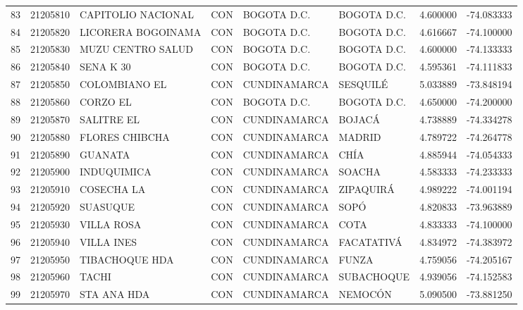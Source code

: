 \documentclass[11pt]{article}
\begin{document}
\begin{table}
\begin{tabular}{lrllllrr}
83  &  21205810 &        CAPITOLIO NACIONAL &  CON &   BOGOTA D.C. &       BOGOTA D.C. &  4.600000 & -74.083333 \\
84  &  21205820 &        LICORERA BOGOINAMA &  CON &   BOGOTA D.C. &       BOGOTA D.C. &  4.616667 & -74.100000 \\
85  &  21205830 &         MUZU CENTRO SALUD &  CON &   BOGOTA D.C. &       BOGOTA D.C. &  4.600000 & -74.133333 \\
86  &  21205840 &                SENA K 30  &  CON &   BOGOTA D.C. &       BOGOTA D.C. &  4.595361 & -74.111833 \\
87  &  21205850 &            COLOMBIANO EL  &  CON &  CUNDINAMARCA &          SESQUILÉ &  5.033889 & -73.848194 \\
88  &  21205860 &                 CORZO EL  &  CON &   BOGOTA D.C. &       BOGOTA D.C. &  4.650000 & -74.200000 \\
89  &  21205870 &               SALITRE EL  &  CON &  CUNDINAMARCA &            BOJACÁ &  4.738889 & -74.334278 \\
90  &  21205880 &            FLORES CHIBCHA &  CON &  CUNDINAMARCA &            MADRID &  4.789722 & -74.264778 \\
91  &  21205890 &                  GUANATA  &  CON &  CUNDINAMARCA &              CHÍA &  4.885944 & -74.054333 \\
92  &  21205900 &              INDUQUIMICA  &  CON &  CUNDINAMARCA &            SOACHA &  4.583333 & -74.233333 \\
93  &  21205910 &               COSECHA LA  &  CON &  CUNDINAMARCA &         ZIPAQUIRÁ &  4.989222 & -74.001194 \\
94  &  21205920 &              SUASUQUE     &  CON &  CUNDINAMARCA &              SOPÓ &  4.820833 & -73.963889 \\
95  &  21205930 &               VILLA ROSA  &  CON &  CUNDINAMARCA &              COTA &  4.833333 & -74.100000 \\
96  &  21205940 &               VILLA INES  &  CON &  CUNDINAMARCA &        FACATATIVÁ &  4.834972 & -74.383972 \\
97  &  21205950 &            TIBACHOQUE HDA &  CON &  CUNDINAMARCA &             FUNZA &  4.759056 & -74.205167 \\
98  &  21205960 &                    TACHI  &  CON &  CUNDINAMARCA &        SUBACHOQUE &  4.939056 & -74.152583 \\
99  &  21205970 &              STA ANA HDA  &  CON &  CUNDINAMARCA &           NEMOCÓN &  5.090500 & -73.881250 \\

\end{tabular}
\end{table}
\end{document}
